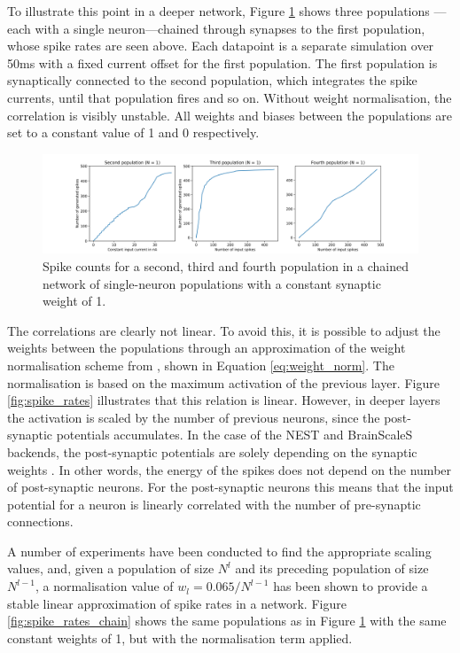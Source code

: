 To illustrate this point in a deeper network, Figure
\ref{fig:spike_rates_not_weighted} shows
three populations
---each with a single neuron---chained
through synapses to the first population, whose spike rates are seen above.
Each datapoint is a separate simulation over 50ms with a fixed
current offset for the first population.
The first population is synaptically connected to the second population, which 
integrates the spike currents, until that population fires and so on.
Without weight normalisation, the correlation is visibly unstable.
All weights and biases between the populations are set to a constant value of 1
and 0 respectively.

\begin{figure}
  \includegraphics[width=\linewidth]{images/spike_rate_not_weighted.png}
  \caption{Spike counts for a second, third and fourth population in a chained network of
  single-neuron populations with a constant synaptic weight of 1.}
  \label{fig:spike_rates_not_weighted}
\end{figure}

The correlations are clearly not linear.
To avoid this, it is possible to adjust the weights between the populations
through an approximation of
the weight normalisation scheme from \textcite{Rueckauer2017}, shown in Equation
\ref{eq:weight_norm}.
The normalisation is based on the maximum activation of the previous layer.
Figure \ref{fig:spike_rates} illustrates that this relation is linear.
However, in deeper layers the activation is scaled by the number of previous
neurons, since the post-synaptic potentials accumulates.
In the case of the NEST and BrainScaleS backends,
the post-synaptic potentials are solely depending on the synaptic weights
\cite{Gewaltig2007, Schmitt2017}.
In other words, the energy of the spikes does not depend on the number of post-synaptic
neurons.
For the post-synaptic neurons this means that the input potential for a neuron
is linearly correlated with the number of pre-synaptic connections.

A number of experiments have been conducted to find the appropriate scaling values,
and, given a population of size $N^l$ and its preceding population of size $N^{l-1}$,
a normalisation value of $w_{l} = 0.065 / N^{l-1}$
has been shown to provide a stable linear approximation of spike rates in a
network.
Figure \ref{fig:spike_rates_chain} shows the same populations as in 
Figure \ref{fig:spike_rates_not_weighted} with the same constant weights of 1, but with
the normalisation term applied.

